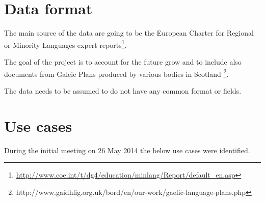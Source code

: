 \documentclass{tufte-book}
\begin{document}
\section{Data format}
The main source of the data are going to be the European Charter for Regional or Minority Languages expert reports\footnote{\url{http://www.coe.int/t/dg4/education/minlang/Report/default_en.asp}}.

The goal of the project is to account for the future grow and to include also documents from Galeic Plans produced by various bodies in Scotland \footnote{http://www.gaidhlig.org.uk/bord/en/our-work/gaelic-language-plans.php}.

The data needs to be assumed to do not have any common format or fields.

\section{Use cases}
During the initial meeting on 26 May 2014 the below use cases were identified.
\end{document}
